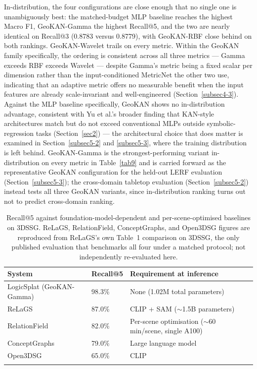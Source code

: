 \documentclass[sn-mathphys,Numbered]{sn-jnl}
\begin{document}
In-distribution, the four configurations are close enough that no single one is unambiguously best: the matched-budget MLP baseline reaches the highest Macro F1, GeoKAN-Gamma the highest Recall@5, and the two are nearly identical on Recall@3 (0.8783 versus 0.8779), with GeoKAN-RBF close behind on both rankings. GeoKAN-Wavelet trails on every metric. Within the GeoKAN family specifically, the ordering is consistent across all three metrics --- Gamma exceeds RBF exceeds Wavelet --- despite Gamma's metric being a fixed scalar per dimension rather than the input-conditioned MetricNet the other two use, indicating that an adaptive metric offers no measurable benefit when the input features are already scale-invariant and well-engineered (Section~\ref{subsec4-3}). Against the MLP baseline specifically, GeoKAN shows no in-distribution advantage, consistent with Yu et al.'s broader finding that KAN-style architectures match but do not exceed conventional MLPs outside symbolic-regression tasks (Section~\ref{sec2}) --- the architectural choice that does matter is examined in Section~\ref{subsec5-2} and \ref{subsec5-3}, where the training distribution is left behind. GeoKAN-Gamma is the strongest-performing variant in-distribution on every metric in Table~\ref{tab9} and is carried forward as the representative GeoKAN configuration for the held-out LERF evaluation (Section~\ref{subsec5-3}); the cross-domain tabletop evaluation (Section~\ref{subsec5-2}) instead tests all three GeoKAN variants, since in-distribution ranking turns out not to predict cross-domain ranking.

\begin{table}[htbp]
\centering
\caption{Recall@5 against foundation-model-dependent and per-scene-optimised baselines on 3DSSG. ReLaGS, RelationField, ConceptGraphs, and Open3DSG figures are reproduced from ReLaGS's own Table~1 comparison on 3DSSG, the only published evaluation that benchmarks all four under a matched protocol; not independently re-evaluated here.}\label{tab10}
\begin{tabular}{@{}llp{5cm}@{}}
\toprule
System & Recall@5 & Requirement at inference \\
\midrule
LogicSplat (GeoKAN-Gamma) & 98.3\% & None (1.02M total parameters) \\
\midrule
ReLaGS & 87.0\% & CLIP + SAM ($\sim$1.5B parameters) \\
\midrule
RelationField & 82.0\% & Per-scene optimisation ($\sim$60 min/scene, single A100) \\
\midrule
ConceptGraphs & 79.0\% & Large language model \\
\midrule
Open3DSG & 65.0\% & CLIP \\
\botrule
\end{tabular}
\end{table}
\end{document}
